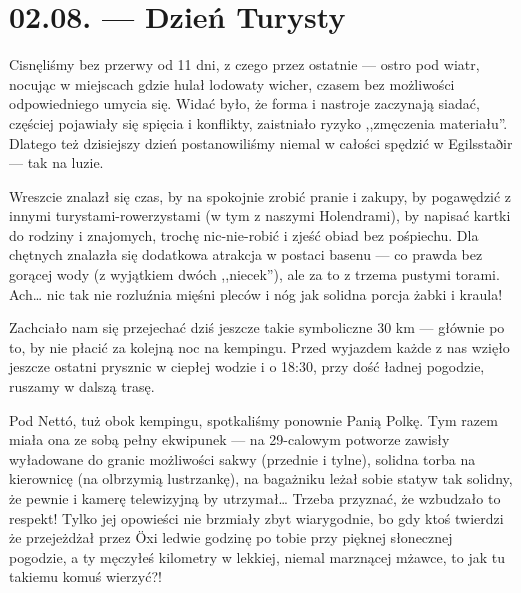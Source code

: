 \chapter*{02.08. --- Dzień Turysty}


Cisnęliśmy bez przerwy od 11 dni, z czego przez ostatnie --- ostro pod wiatr, nocując w miejscach gdzie hulał lodowaty wicher, czasem bez możliwości odpowiedniego umycia się. Widać było, że forma i nastroje zaczynają siadać, częściej pojawiały się spięcia i konflikty, zaistniało ryzyko ,,zmęczenia materiału''. Dlatego też dzisiejszy dzień postanowiliśmy niemal w całości spędzić w Egilsstaðir --- tak na luzie.

Wreszcie znalazł się czas, by na spokojnie zrobić pranie i zakupy, by pogawędzić z innymi turystami-rowerzystami (w tym z naszymi Holendrami), by napisać kartki do rodziny i znajomych, trochę nic-nie-robić i zjeść obiad bez pośpiechu. Dla chętnych znalazła się dodatkowa atrakcja w postaci basenu --- co prawda bez gorącej wody (z wyjątkiem dwóch ,,niecek''), ale za to z trzema pustymi torami. Ach… nic tak nie rozluźnia mięśni pleców i nóg jak solidna porcja żabki i kraula!


Zachciało nam się przejechać dziś jeszcze takie symboliczne 30 km --- głównie po to, by nie płacić za kolejną noc na kempingu. Przed wyjazdem każde z nas wzięło jeszcze ostatni prysznic w ciepłej wodzie i o 18:30, przy dość ładnej pogodzie, ruszamy w dalszą trasę.

Pod Nettó, tuż obok kempingu, spotkaliśmy ponownie Panią Polkę. Tym razem miała ona ze sobą pełny ekwipunek --- na 29-calowym potworze zawisły wyładowane do granic możliwości sakwy (przednie i tylne), solidna torba na kierownicę (na olbrzymią lustrzankę), na bagażniku leżał sobie statyw tak solidny, że pewnie i kamerę telewizyjną by utrzymał… Trzeba przyznać, że wzbudzało to respekt! Tylko jej opowieści nie brzmiały zbyt wiarygodnie, bo gdy ktoś twierdzi że przejeżdżał przez Öxi ledwie godzinę po tobie przy pięknej słonecznej pogodzie, a ty męczyłeś kilometry w lekkiej, niemal marznącej mżawce, to jak tu takiemu komuś wierzyć?!

